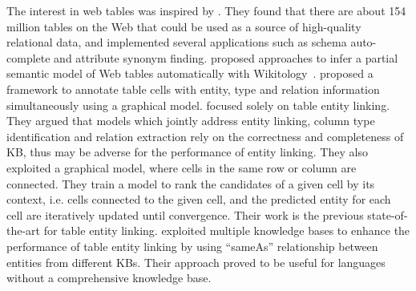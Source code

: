 The interest in web tables was inspired by \cite{cafarella2008webtables}. They found that there are about 154 million tables on the Web that could be used as a source of high-quality relational data, and implemented several applications such as schema auto-complete and attribute synonym finding. \cite{syed2010exploiting} proposed approaches to infer a partial semantic model of Web tables automatically with Wikitology~\cite{}.  \cite{limaye2010annotating} proposed a framework to annotate table cells with entity, type and relation information simultaneously using a graphical model. \cite{bhagavatula2015tabel} focused solely on table entity linking. They argued that models which jointly address entity linking, column type identification and relation extraction rely on the correctness and completeness of KB, thus may be adverse for the performance of entity linking. They also exploited a graphical model, where cells in the same row or column are connected. They train a model to rank the candidates of a given cell by its context, i.e. cells connected to the given cell, and the predicted entity for each cell are iteratively updated until convergence. Their work is the previous state-of-the-art for table entity linking.
\cite{wu2016entity} exploited multiple knowledge bases to enhance the performance of table entity linking by using ``sameAs'' relationship between entities from different KBs. Their approach proved to be useful for languages without a comprehensive knowledge base.